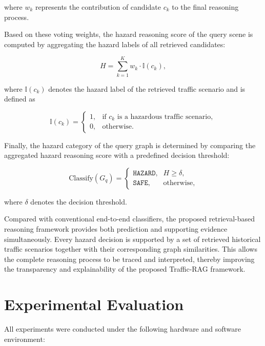 \documentclass[a4paper, 11pt]{article} %
\begin{document}
where $w_k$ represents the contribution of candidate $c_k$ to the final reasoning process.

Based on these voting weights, the hazard reasoning score of the query scene is computed by aggregating the hazard labels of all retrieved candidates:

\begin{equation}
H
=
\sum_{k=1}^{K}
w_k
\cdot
\mathbb{I}(c_k),
\label{eq:hazard_index}
\end{equation}

where $\mathbb{I}(c_k)$ denotes the hazard label of the retrieved traffic scenario and is defined as

\[
\mathbb{I}(c_k)
=
\begin{cases}
1,& \text{if } c_k \text{ is a hazardous traffic scenario},\\
0,& \text{otherwise}.
\end{cases}
\]

Finally, the hazard category of the query graph is determined by comparing the aggregated hazard reasoning score with a predefined decision threshold:

\begin{equation}
\mathrm{Classify}(G_q)
=
\begin{cases}
\texttt{HAZARD}, & H \ge \delta,\\
\texttt{SAFE}, & \text{otherwise},
\end{cases}
\label{eq:hazard_decision}
\end{equation}

where $\delta$ denotes the decision threshold.

Compared with conventional end-to-end classifiers, the proposed retrieval-based reasoning framework provides both prediction and supporting evidence simultaneously. Every hazard decision is supported by a set of retrieved historical traffic scenarios together with their corresponding graph similarities. This allows the complete reasoning process to be traced and interpreted, thereby improving the transparency and explainability of the proposed Traffic-RAG framework.
\newpage
\section{Experimental Evaluation}

All experiments were conducted under the following hardware and software environment:
\end{document}
